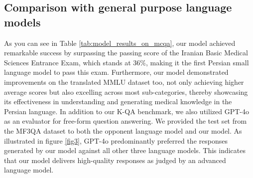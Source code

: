 \documentclass[conference]{IEEEtran}
\begin{document}
\subsection{Comparison with general purpose language models}
As you can see in Table \ref{tab:model_results_on_mcqa}, our model achieved remarkable success by surpassing the passing score of the Iranian Basic Medical Sciences Entrance Exam, which stands at 36\%, making it the first Persian small language model to pass this exam. Furthermore, our model demonstrated improvements on the translated MMLU dataset too, not only achieving higher average scores but also excelling across most sub-categories, thereby showcasing its effectiveness in understanding and generating medical knowledge in the Persian language. In addition to our K-QA benchmark, we also utilized GPT-4o 
\cite{b30} 
as an evaluator for free-form question answering. We provided the test set from the MF3QA dataset to both the opponent language model and our model. As illustrated in figure \ref{fig3}, GPT-4o predominantly preferred the responses generated by our model against all other three language models. This indicates that our model delivers high-quality responses as judged by an advanced language model.
\end{document}
